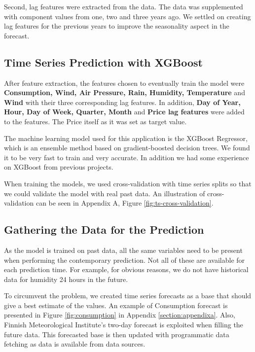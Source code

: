 \documentclass{article}
\begin{document}
Second, lag features were extracted from the data. The data was supplemented with component values from one, two and three years ago. We settled on creating lag features for the previous years to improve the seasonality aspect in the forecast.

\subsection{Time Series Prediction with XGBoost}
\label{subsection:xgboost}

After feature extraction, the features chosen to eventually train the model were \textbf{Consumption, Wind, Air Pressure, Rain, Humidity, Temperature} and \textbf{Wind} with their three corresponding lag features. In addition, \textbf{Day of Year, Hour, Day of Week, Quarter, Month} and \textbf{Price lag features} were added to the features. The Price itself as it was set as target value.

The machine learning model used for this application is the XGBoost Regressor, which is an ensemble method based on gradient-boosted decision trees. We found it to be very fast to train and very accurate. In addition we had some experience on XGBoost from previous projects. 

When training the models, we used cross-validation with time series splits so that we could validate the model with real past data. An illustration of cross-validation can be seen in Appendix A, Figure \ref{fig:ts-cross-validation}.



\subsection{Gathering the Data for the Prediction}
\label{subsection:datafilling}

As the model is trained on past data, all the same variables need to be present when performing the contemporary prediction. Not all of these are available for each prediction time. For example, for obvious reasons, we do not have historical data for humidity 24 hours in the future.

To circumvent the problem, we created time series forecasts as a base that should give a best estimate of the values. An example of Consumption forecast is presented in Figure \ref{fig:consumption} in Appendix \ref{section:appendixa}. Also, Finnish Meteorological Institute's two-day forecast is exploited when filling the future data. This forecasted base is then updated with programmatic data fetching as data is available from data sources.
\end{document}
